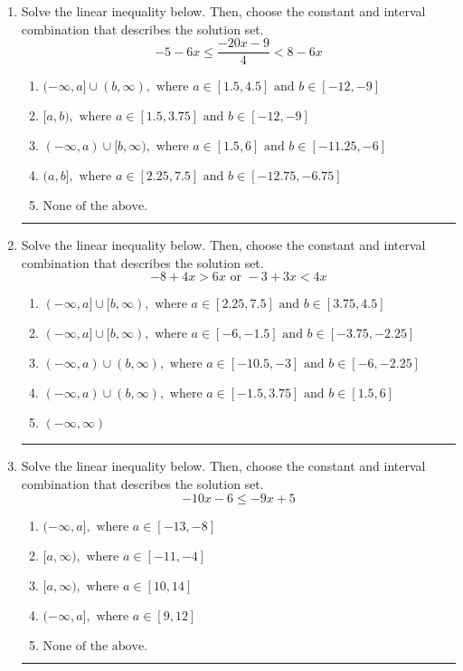 \documentclass[14pt]{extbook}
\newcommand{\litem}[1]{\item#1\hspace*{-1cm}\rule{\textwidth}{0.4pt}}
\begin{document}
\begin{enumerate}
{\begin{enumerate}[label=\Alph*.]
\end{enumerate} }
\litem{
Solve the linear inequality below. Then, choose the constant and interval combination that describes the solution set.\[ -5 - 6 x \leq \frac{-20 x - 9}{4} < 8 - 6 x \]\begin{enumerate}[label=\Alph*.]
\item \( (-\infty, a] \cup (b, \infty), \text{ where } a \in [1.5, 4.5] \text{ and } b \in [-12, -9] \)
\item \( [a, b), \text{ where } a \in [1.5, 3.75] \text{ and } b \in [-12, -9] \)
\item \( (-\infty, a) \cup [b, \infty), \text{ where } a \in [1.5, 6] \text{ and } b \in [-11.25, -6] \)
\item \( (a, b], \text{ where } a \in [2.25, 7.5] \text{ and } b \in [-12.75, -6.75] \)
\item \( \text{None of the above.} \)

\end{enumerate} }
\litem{
Solve the linear inequality below. Then, choose the constant and interval combination that describes the solution set.\[ -8 + 4 x > 6 x \text{ or } -3 + 3 x < 4 x \]\begin{enumerate}[label=\Alph*.]
\item \( (-\infty, a] \cup [b, \infty), \text{ where } a \in [2.25, 7.5] \text{ and } b \in [3.75, 4.5] \)
\item \( (-\infty, a] \cup [b, \infty), \text{ where } a \in [-6, -1.5] \text{ and } b \in [-3.75, -2.25] \)
\item \( (-\infty, a) \cup (b, \infty), \text{ where } a \in [-10.5, -3] \text{ and } b \in [-6, -2.25] \)
\item \( (-\infty, a) \cup (b, \infty), \text{ where } a \in [-1.5, 3.75] \text{ and } b \in [1.5, 6] \)
\item \( (-\infty, \infty) \)

\end{enumerate} }
\litem{
Solve the linear inequality below. Then, choose the constant and interval combination that describes the solution set.\[ -10x -6 \leq -9x + 5 \]\begin{enumerate}[label=\Alph*.]
\item \( (-\infty, a], \text{ where } a \in [-13, -8] \)
\item \( [a, \infty), \text{ where } a \in [-11, -4] \)
\item \( [a, \infty), \text{ where } a \in [10, 14] \)
\item \( (-\infty, a], \text{ where } a \in [9, 12] \)
\item \( \text{None of the above}. \)


\end{enumerate}}
\end{enumerate}
\end{document}
